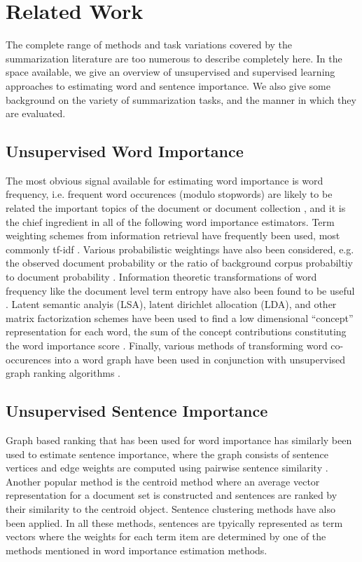 \section{Related Work}


The complete range of methods and task variations covered by the summarization
literature are too numerous to describe completely here. In the space 
available, we give an overview of unsupervised and supervised learning
approaches to estimating word and sentence importance. 
We also give some background on the variety
of summarization tasks, and the manner in which they are evaluated.


\subsection{Unsupervised Word Importance}


The most obvious signal available for estimating word importance is word 
frequency, i.e. frequent word occurences (modulo stopwords) are likely 
to be related the important topics of the document or document collection 
\cite{topic_sigs}, and it is the chief ingredient in all of the following
word importance estimators.
Term weighting schemes from information retrieval
have frequently been used, most commonly tf-idf 
\cite{centroid,maybe_conroy,find_others}. 
Various probabilistic weightings have also been considered, e.g. the
observed document probability \cite{freq_sum} or the ratio of background
corpus probabiltiy to document probability \cite{topic_sigs}.
Information theoretic transformations of word frequency like the document
level term entropy
have also been found to be useful \cite{klsum,reference_less_summarization}.
Latent semantic analyis (LSA), latent dirichlet allocation (LDA), and
other matrix factorization schemes have been used to find a low dimensional
``concept'' representation for each word, the sum of the concept contributions
constituting the word importance score \cite{multiling_stuff}.
Finally, various methods of transforming word co-occurences into a word graph
have been used in conjunction with unsupervised graph ranking algorithms
\cite{lexrank,conroy_multiling,zhao_2009}.


\subsection{Unsupervised Sentence Importance}

 Graph based ranking that has been used for word importance has similarly 
been used to estimate sentence importance, where the graph consists of 
sentence vertices and edge weights are computed using pairwise sentence 
similarity \cite{textrank}. Another popular method is the centroid method
\cite{centroid} where an average vector representation for a document set is 
constructed and sentences are ranked by their similarity to the centroid object.
Sentence clustering methods have also been applied. In all these methods, 
sentences are tpyically represented as term vectors where the weights for 
each term item are determined by one of the methods mentioned in word importance
estimation methods. 


